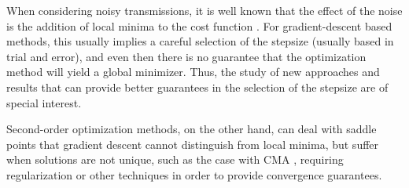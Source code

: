 When considering noisy transmissions, it is well known that the effect of the noise is the addition of local minima to the cost function \cite{Ding2000}. For gradient-descent based methods, this usually implies a careful selection of the stepsize (usually based in trial and error), and even then there is no guarantee that the optimization method will yield a global minimizer. Thus, the study of new approaches and results that can provide better guarantees in the selection of the stepsize are of special interest.

Second-order optimization methods, on the other hand, can deal with saddle points that gradient descent cannot distinguish from local minima, but suffer when solutions are not unique, such as the case with CMA \cite{Kreutz2008trustregionscma}, requiring regularization or other techniques in order to provide convergence guarantees. 